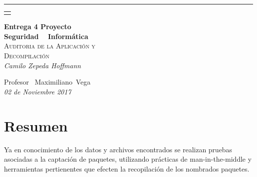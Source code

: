 \documentclass[a4paper,11pt]{article}
\theoremstyle{mytheor}
\begin{document}
\begin{titlepage} %
	
	\raggedleft %
	
	\rule{1pt}{\textheight} %
	\hspace{0.05\textwidth} %
	\parbox[b]{0.75\textwidth}{ %
	 \begin{tabularx}{\linewidth}{}
     \end{tabularx}
     \bigskip
     \vfill
		{\Huge\bfseries Entrega \textnumero{} 4 Proyecto\\[0.5\baselineskip] Seguridad ~ Informática}\\[2\baselineskip] %
		{\large\textsc{Auditoria de la Aplicación y}}\\
		{\large\textsc{Decompilación }}\\[1\baselineskip] %
		{\normalsize\textit{Camilo Zepeda Hoffmann}} %
		
		\vspace{0.5\textheight} %
		
		{\noindent Profesor~ Maximiliano~Vega\plogo}\\[\baselineskip] %
		{\normalsize\textit{02 de Noviembre 2017}}
	}

\end{titlepage}


\section{Resumen}

Ya en conocimiento de los datos y archivos encontrados se realizan pruebas asociadas a la captación de paquetes, utilizando prácticas de man-in-the-middle y herramientas pertienentes que efecten la recopilación de los nombrados paquetes.
\end{document}
